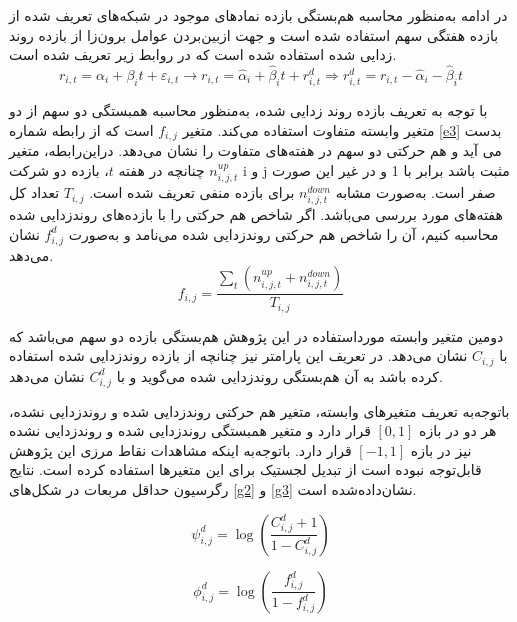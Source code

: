 \documentclass[12pt]{article}
\begin{document}
در ادامه به‌منظور محاسبه هم‌بستگی بازده نمادهای موجود در شبکه‌های تعریف شده از بازده هفتگی سهم استفاده شده است و جهت ازبین‌بردن عوامل برون‌زا از بازده روند زدایی شده استفاده شده است که در روابط زیر تعریف شده است.
\begin{equation}
r_{i,t} = \alpha_i +\beta_i t + \varepsilon_{i,t} \rightarrow r_{i,t} = \hat{\alpha}_i +\hat{\beta}_i t + r^d_{i,t} \Rightarrow r^d_{i,t} = r_{i,t} -\hat{\alpha}_i -\hat{\beta}_i t 
\end{equation}


با توجه به تعریف بازده روند زدایی شده، به‌منظور محاسبه همبستگی دو سهم از دو متغیر وابسته متفاوت استفاده می‌کند. متغیر
 $ f_{i,j} $ 
است که از رابطه شماره
\ref{e3}
بدست می آید و هم حرکتی دو سهم در هفته‌های متفاوت را نشان می‌دهد. دراین‌رابطه، متغیر 
 $ n_{i,j,t}^{up} $ 
چنانچه در هفته $ t $، بازده دو شرکت i و j مثبت باشد برابر با 1 و در غیر این صورت صفر است. به‌صورت مشابه
 $ n_{i,j,t}^{down} $
 برای بازده منفی تعریف شده است.
 $ T_{i,j} $
 تعداد کل هفته‌های مورد بررسی می‌باشد. اگر شاخص هم حرکتی را با بازده‌های روندزدایی شده محاسبه کنیم، آن را شاخص هم حرکتی روندزدایی شده می‌نامد و به‌صورت
 $ f^d_{i,j} $ 
نشان می‌دهد.
\begin{equation}
f_{i,j}  = \frac{\sum_t (n_{i,j,t}^{up}+n_{i,j,t}^{down})}{T_{i,j}}
\label{e3}
\end{equation}

دومین متغیر وابسته مورداستفاده در این پژوهش هم‌بستگی بازده دو سهم می‌باشد که با $ C_{i,j} $ نشان می‌دهد. در تعریف این پارامتر نیز چنانچه از بازده روندزدایی شده استفاده کرده باشد به آن هم‌بستگی روندزدایی شده می‌گوید و با $ C^d_{i,j} $ نشان می‌دهد.

باتوجه‌به تعریف متغیرهای وابسته، متغیر هم حرکتی روندزدایی شده و روندزدایی نشده، هر دو در بازه 
$ [0,1] $
 قرار دارد و متغیر همبستگی روندزدایی شده و روندزدایی نشده نیز در بازه
 $ [-1,1] $
 قرار دارد. باتوجه‌به اینکه مشاهدات نقاط مرزی این پژوهش قابل‌توجه نبوده است از تبدیل لجستیک برای این متغیرها استفاده کرده است. نتایج رگرسیون حداقل مربعات در شکل‌های 
\ref{g2} 
و
\ref{g3}
نشان‌داده‌شده است.

\begin{equation}
\psi_{i,j}^d = \log(\frac{C^d_{i,j}+1}{1-C^d_{i,j}})
\end{equation}

\begin{equation}
\phi_{i,j}^d = \log(\frac{f^d_{i,j}}{1-f^d_{i,j}})
\end{equation}
\end{document}
